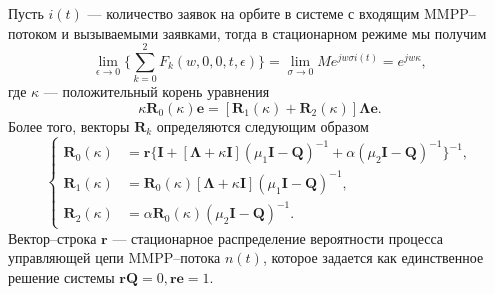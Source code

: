 \begin{theorem} \label{R_theorem}
	Пусть $i(t)$ --- количество заявок на орбите в системе с входящим MMPP--потоком и вызываемыми заявками, тогда в стационарном режиме мы получим
	\begin{equation*}
		\lim_{\epsilon \xrightarrow{} 0}\{\sum_{k=0}^{2}F_{k}(w,0,0,t,\epsilon)\} = \lim_{\sigma \xrightarrow{} 0} M e^{jw\sigma i(t)} = e^{jw\kappa},
	\end{equation*}
где $\kappa$ --- положительный корень уравнения
\begin{equation*}
	\kappa \boldsymbol{R}_{0}(\kappa)\boldsymbol{e} = [\boldsymbol{R}_{1}(\kappa) + \boldsymbol{R}_{2}(\kappa)]\boldsymbol{\Lambda}\boldsymbol{e}.
\end{equation*}
Более того, векторы $\boldsymbol{R}_{k}$ определяются следующим образом
\begin{equation*}
	\left\{
	\begin{aligned}
		\boldsymbol{R}_{0}(\kappa) & = \boldsymbol{r}\{\boldsymbol{I} + [\boldsymbol{\Lambda} + \kappa\boldsymbol{I}](\mu_{1}\boldsymbol{I}-\boldsymbol{Q})^{-1}+\alpha(\mu_{2}\boldsymbol{I}-\boldsymbol{Q})^{-1}\}^{-1},\\
		\boldsymbol{R}_{1}(\kappa) & = \boldsymbol{R}_{0}(\kappa)[\boldsymbol{\Lambda} + \kappa\boldsymbol{I}](\mu_{1}\boldsymbol{I} - \boldsymbol{Q})^{-1},\\
		\boldsymbol{R}_{2}(\kappa) & = \alpha\boldsymbol{R}_{0}(\kappa)(\mu_{2}\boldsymbol{I} - \boldsymbol{Q})^{-1}.
	\end{aligned}
\right.
\end{equation*}
Вектор--строка $\boldsymbol{r}$ --- стационарное распределение вероятности процесса управляющей цепи MMPP--потока $n(t)$, которое задается как единственное решение системы $\boldsymbol{r}\boldsymbol{Q} =0, \boldsymbol{r}\boldsymbol{e} = 1$.
\end{theorem}
